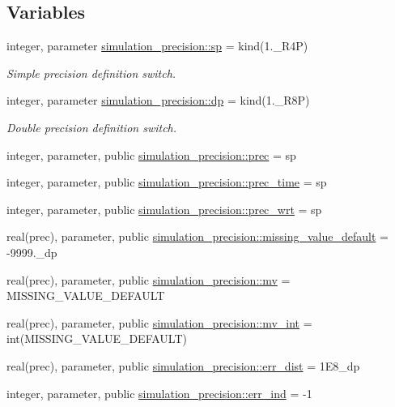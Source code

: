 \subsection*{Variables}
\begin{DoxyCompactItemize}
\item 
integer, parameter \hyperlink{namespacesimulation__precision_a3657003647318cfe37c797ab37448a2e}{simulation\+\_\+precision\+::sp} = kind(1.\+\_\+\+R4P)
\begin{DoxyCompactList}\small\item\em Simple precision definition switch. \end{DoxyCompactList}\item 
integer, parameter \hyperlink{namespacesimulation__precision_af01fc62f503e0ff9a95c9ee2960c9a7f}{simulation\+\_\+precision\+::dp} = kind(1.\+\_\+\+R8P)
\begin{DoxyCompactList}\small\item\em Double precision definition switch. \end{DoxyCompactList}\item 
integer, parameter, public \hyperlink{namespacesimulation__precision_a6d3bcd3b4ff2cfb92ec9fe36ecad405b}{simulation\+\_\+precision\+::prec} = sp
\item 
integer, parameter, public \hyperlink{namespacesimulation__precision_a09a1db15abeed81ff2f54b363128ffed}{simulation\+\_\+precision\+::prec\+\_\+time} = sp
\item 
integer, parameter, public \hyperlink{namespacesimulation__precision_a049e8de4fad9c285d2cc71e8982e2971}{simulation\+\_\+precision\+::prec\+\_\+wrt} = sp
\item 
real(prec), parameter, public \hyperlink{namespacesimulation__precision_a5983f631bbe7a6e5d43d2a458db81460}{simulation\+\_\+precision\+::missing\+\_\+value\+\_\+default} = -\/9999.\+\_\+dp
\item 
real(prec), parameter, public \hyperlink{namespacesimulation__precision_a4416a112b4fc53848f9f18fe5e9003db}{simulation\+\_\+precision\+::mv} = M\+I\+S\+S\+I\+N\+G\+\_\+\+V\+A\+L\+U\+E\+\_\+\+D\+E\+F\+A\+U\+LT
\item 
real(prec), parameter, public \hyperlink{namespacesimulation__precision_ae23a853ee1499839ea702b3c01e443fc}{simulation\+\_\+precision\+::mv\+\_\+int} = int(M\+I\+S\+S\+I\+N\+G\+\_\+\+V\+A\+L\+U\+E\+\_\+\+D\+E\+F\+A\+U\+LT)
\item 
real(prec), parameter, public \hyperlink{namespacesimulation__precision_acb6a32a47c43de36b53bb8033aa2738e}{simulation\+\_\+precision\+::err\+\_\+dist} = 1\+E8\+\_\+dp
\item 
integer, parameter, public \hyperlink{namespacesimulation__precision_a531d4e8c47b468cf4212393a5b84c7c8}{simulation\+\_\+precision\+::err\+\_\+ind} = -\/1
\end{DoxyCompactItemize}
